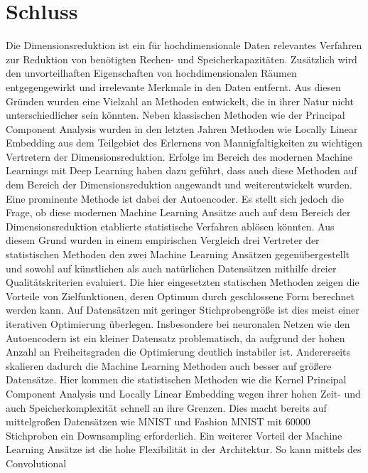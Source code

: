 \chapter{Schluss}
\label{ch:Schluss}

Die Dimensionsreduktion ist ein für hochdimensionale Daten relevantes Verfahren zur Reduktion von
benötigten Rechen- und Speicherkapazitäten. Zusätzlich wird den unvorteilhaften Eigenschaften von
hochdimensionalen Räumen entgegengewirkt und irrelevante Merkmale in den Daten entfernt. Aus diesen
Gründen wurden eine Vielzahl an Methoden entwickelt, die in ihrer Natur nicht unterschiedlicher
sein könnten. Neben klassischen Methoden wie der Principal Component Analysis wurden in den letzten
Jahren Methoden wie Locally Linear Embedding aus dem Teilgebiet des Erlernens von
Mannigfaltigkeiten zu wichtigen Vertretern der Dimensionsreduktion. Erfolge im Bereich des modernen
Machine Learnings mit Deep Learning haben dazu geführt, dass auch diese Methoden auf dem Bereich
der Dimensionsreduktion angewandt und weiterentwickelt wurden. Eine prominente Methode ist dabei
der Autoencoder. Es stellt sich jedoch die Frage, ob diese modernen Machine Learning Ansätze auch
auf dem Bereich der Dimensionsreduktion etablierte statistische Verfahren ablösen könnten. Aus
diesem Grund wurden in einem empirischen Vergleich drei Vertreter der statistischen Methoden den
zwei Machine Learning Ansätzen gegenübergestellt und sowohl auf künstlichen als auch natürlichen
Datensätzen mithilfe dreier Qualitätskriterien evaluiert. Die hier eingesetzten statischen Methoden
zeigen die Vorteile von Zielfunktionen, deren Optimum durch geschlossene Form berechnet werden
kann. Auf Datensätzen mit geringer Stichprobengröße ist dies meist einer iterativen Optimierung
überlegen. Insbesondere bei neuronalen Netzen wie den Autoencodern ist ein kleiner Datensatz
problematisch, da aufgrund der hohen Anzahl an Freiheitsgraden die Optimierung deutlich instabiler
ist. Andererseits skalieren dadurch die Machine Learning Methoden auch besser auf größere
Datensätze. Hier kommen die statistischen Methoden wie die Kernel Principal Component Analysis und
Locally Linear Embedding wegen ihrer hohen Zeit- und auch Speicherkomplexität schnell an ihre
Grenzen. Dies macht bereits auf mittelgroßen Datensätzen wie MNIST und Fashion MNIST mit
\num{60000} Stichproben ein Downsampling erforderlich. Ein weiterer Vorteil der Machine Learning
Ansätze ist die hohe Flexibilität in der Architektur. So kann mittels des Convolutional
